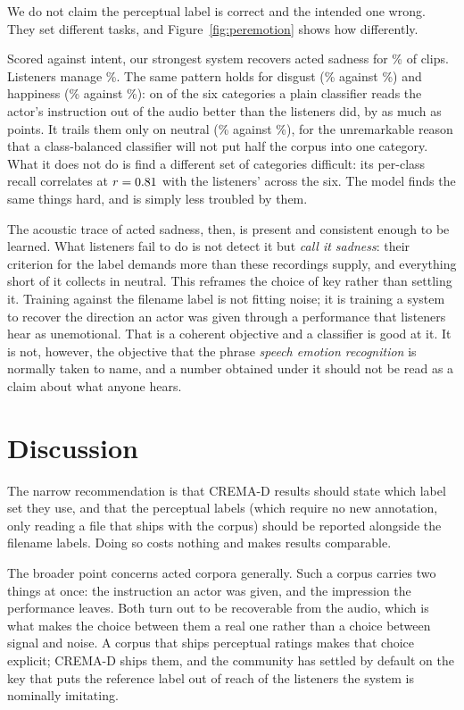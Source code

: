\documentclass{article}
\begin{document}
We do not claim the perceptual label is correct and the intended one wrong. They
set different tasks, and Figure~\ref{fig:peremotion} shows how differently.

Scored against intent, our strongest system recovers acted sadness for
\ModelSad\% of clips. Listeners manage \HumanSad\%. The same pattern holds for
disgust (\ModelDis\% against \HumanDis\%) and happiness (\ModelHap\% against
\HumanHap\%): on \NBeatHuman{} of the six categories a plain classifier reads
the actor's instruction out of the audio better than the listeners did, by as
much as \ModelBeatsBy{} points. It trails them only on neutral (\ModelNeu\%
against \HumanNeu\%), for the unremarkable reason that a class-balanced
classifier will not put half the corpus into one category. What it does not do
is find a different set of categories difficult: its per-class recall correlates
at $r = 0.81$ with the listeners' across the six. The model finds the
same things hard, and is simply less troubled by them.

The acoustic trace of acted sadness, then, is present and consistent enough to
be learned. What listeners fail to do is not detect it but \emph{call it
sadness}: their criterion for the label demands more than these recordings
supply, and everything short of it collects in neutral. This reframes the choice
of key rather than settling it. Training against the filename label is not
fitting noise; it is training a system to recover the direction an actor was
given through a performance that listeners hear as unemotional. That is a
coherent objective and a classifier is good at it. It is not, however, the
objective that the phrase \emph{speech emotion recognition} is normally taken to
name, and a number obtained under it should not be read as a claim about what
anyone hears.

\section{Discussion}
\label{sec:discussion}

The narrow recommendation is that CREMA-D results should state which label set
they use, and that the perceptual labels (which require no new annotation, only
reading a file that ships with the corpus) should be reported alongside the
filename labels. Doing so costs nothing and makes results comparable.

The broader point concerns acted corpora generally. Such a corpus carries two
things at once: the instruction an actor was given, and the impression the
performance leaves. Both turn out to be recoverable from the audio, which is
what makes the choice between them a real one rather than a choice between
signal and noise. A corpus that ships perceptual ratings makes that choice
explicit; CREMA-D ships them, and the community has settled by default on the
key that puts the reference label out of reach of the listeners the system is
nominally imitating.
\end{document}
